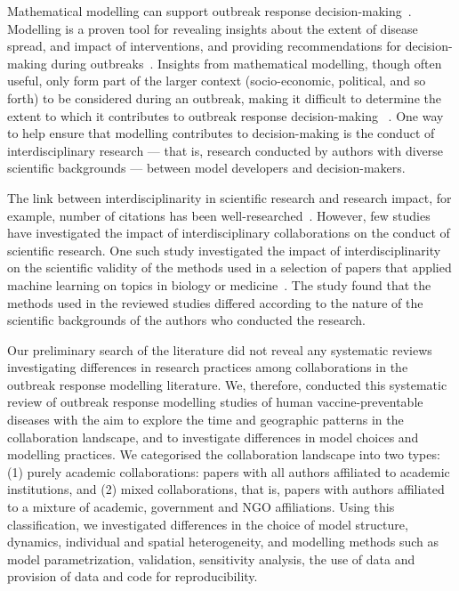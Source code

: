 \documentclass[10pt,letterpaper]{article}
\begin{document}
Mathematical modelling can support outbreak response decision-making~\cite{Lofgren2015}. Modelling is a proven tool for revealing insights about the extent of disease spread, and impact of interventions, and providing recommendations for decision-making during outbreaks~\cite{Kretzschmar2020,Whitty2014,Lofgren2015}. Insights from mathematical modelling, though often useful, only form part of the larger context (socio-economic, political, and so forth) to be considered during an outbreak, making it difficult to determine the extent to which it contributes to outbreak response decision-making ~\cite{Kretzschmar2020,Kerkhove2012}. One way to help ensure that modelling contributes to decision-making is the conduct of interdisciplinary research  --- that is, research conducted by authors with diverse scientific backgrounds --- between model developers and decision-makers.

The link between interdisciplinarity in scientific research and research impact, for example, number of citations has been well-researched~\cite{Abramo2017,Wagner2011}. However, few studies have investigated the impact of interdisciplinary collaborations on the conduct of scientific research. One such study investigated the impact of interdisciplinarity on the scientific validity of the methods used in a selection of papers that applied machine learning on topics in biology or medicine~\cite{Littmann2020}. The study found that the methods used in the reviewed studies differed according to the nature of the scientific backgrounds of the authors who conducted the research. 

Our preliminary search of the literature did not reveal any systematic reviews investigating differences in research practices among collaborations in the outbreak response modelling literature. We, therefore, conducted this systematic review of outbreak response modelling studies of human vaccine-preventable diseases with the aim to explore the time and geographic patterns in the collaboration landscape, and to investigate differences in model choices and modelling practices. We categorised the collaboration landscape into two types: (1) purely academic collaborations: papers with all authors affiliated to academic institutions, and (2) mixed collaborations, that is, papers with authors affiliated to a mixture of academic, government and NGO affiliations. Using this classification, we investigated differences in the choice of model structure, dynamics, individual and spatial heterogeneity, and modelling methods such as model parametrization, validation, sensitivity analysis, the use of data and provision of data and code for reproducibility. 
\end{document}
